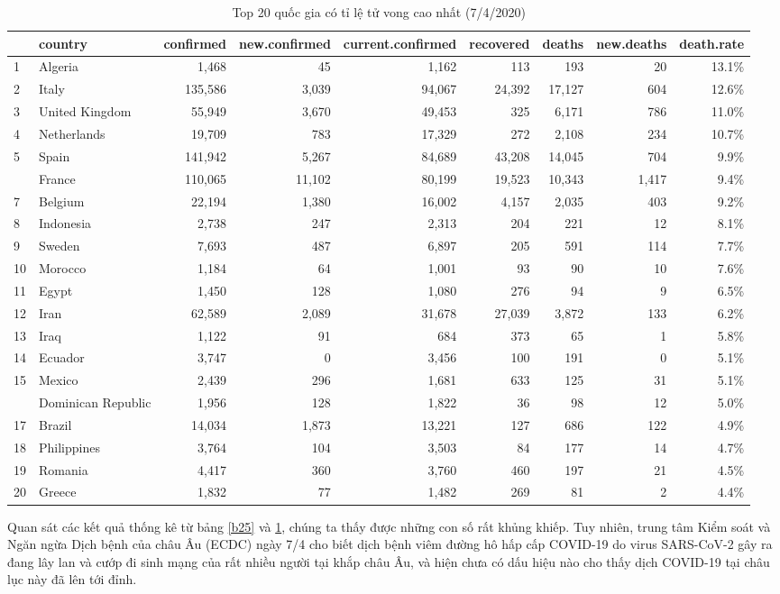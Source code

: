 \documentclass[12pt, a4paper,oneside]{book}
\theoremstyle{definition}
\begin{document}
\begin{table}[!h]
	\caption{Top 20 quốc gia có tỉ lệ tử vong cao nhất (7/4/2020)}
	\label{b26}
	\centering
	\fontsize{7}{9}\selectfont
	\begin{tabular}{llrrrrrrr}
		\toprule
		& country & confirmed & new.confirmed & current.confirmed & recovered & deaths & new.deaths & death.rate\\
		\midrule
		\rowcolor{gray!6}  1 & Algeria & 1,468 & 45 & 1,162 & 113 & 193 & 20 & 13.1\%\\
		2 & Italy & 135,586 & 3,039 & 94,067 & 24,392 & 17,127 & 604 & 12.6\%\\
		\rowcolor{gray!6}  3 & United Kingdom & 55,949 & 3,670 & 49,453 & 325 & 6,171 & 786 & 11.0\%\\
		4 & Netherlands & 19,709 & 783 & 17,329 & 272 & 2,108 & 234 & 10.7\%\\
		\rowcolor{gray!6}  5 & Spain & 141,942 & 5,267 & 84,689 & 43,208 & 14,045 & 704 & 9.9\%\\
		\addlinespace
		6 & France & 110,065 & 11,102 & 80,199 & 19,523 & 10,343 & 1,417 & 9.4\%\\
		\rowcolor{gray!6}  7 & Belgium & 22,194 & 1,380 & 16,002 & 4,157 & 2,035 & 403 & 9.2\%\\
		8 & Indonesia & 2,738 & 247 & 2,313 & 204 & 221 & 12 & 8.1\%\\
		\rowcolor{gray!6}  9 & Sweden & 7,693 & 487 & 6,897 & 205 & 591 & 114 & 7.7\%\\
		10 & Morocco & 1,184 & 64 & 1,001 & 93 & 90 & 10 & 7.6\%\\
		\addlinespace
		\rowcolor{gray!6}  11 & Egypt & 1,450 & 128 & 1,080 & 276 & 94 & 9 & 6.5\%\\
		12 & Iran & 62,589 & 2,089 & 31,678 & 27,039 & 3,872 & 133 & 6.2\%\\
		\rowcolor{gray!6}  13 & Iraq & 1,122 & 91 & 684 & 373 & 65 & 1 & 5.8\%\\
		14 & Ecuador & 3,747 & 0 & 3,456 & 100 & 191 & 0 & 5.1\%\\
		\rowcolor{gray!6}  15 & Mexico & 2,439 & 296 & 1,681 & 633 & 125 & 31 & 5.1\%\\
		\addlinespace
		16 & Dominican Republic & 1,956 & 128 & 1,822 & 36 & 98 & 12 & 5.0\%\\
		\rowcolor{gray!6}  17 & Brazil & 14,034 & 1,873 & 13,221 & 127 & 686 & 122 & 4.9\%\\
		18 & Philippines & 3,764 & 104 & 3,503 & 84 & 177 & 14 & 4.7\%\\
		\rowcolor{gray!6}  19 & Romania & 4,417 & 360 & 3,760 & 460 & 197 & 21 & 4.5\%\\
		20 & Greece & 1,832 & 77 & 1,482 & 269 & 81 & 2 & 4.4\%\\
		\bottomrule
	\end{tabular}
\end{table}
Quan sát các kết quả thống kê từ bảng \ref{b25} và \ref{b26}, chúng ta thấy được những con số rất khủng khiếp. Tuy nhiên, trung tâm Kiểm soát và Ngăn ngừa Dịch bệnh của châu Âu (ECDC) ngày 7/4 cho biết dịch bệnh viêm đường hô hấp cấp COVID-19 do virus SARS-CoV-2 gây ra đang lây lan và cướp đi sinh mạng của rất nhiều người tại khắp châu Âu, và hiện chưa có dấu hiệu nào cho thấy dịch COVID-19 tại châu lục này đã lên tới đỉnh.
\end{document}
